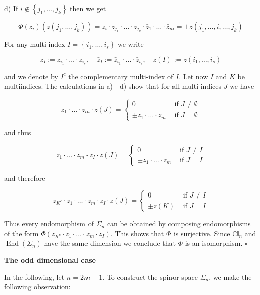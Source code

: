 \documentclass[10pt, letterpaper]{article}
\begin{document}
d) If $i \notin\left\{j_{1}, \ldots, j_{k}\right\}$ then we get

$$
\Phi\left(z_{i}\right)\left(z\left(j_{1}, \ldots, j_{k}\right)\right)=z_{i} \cdot z_{j_{1}} \cdot \ldots \cdot z_{j_{k}} \cdot \bar{z}_{1} \cdot \ldots \cdot \bar{z}_{m}= \pm z\left(j_{1}, \ldots, i, \ldots, j_{k}\right)
$$

For any multi-index $I=\left\{i_{1}, \ldots, i_{s}\right\}$ we write

$$
z_{I}:=z_{i_{1}} \cdot \ldots \cdot z_{i_{s}}, \quad \bar{z}_{I}:=\bar{z}_{i_{1}} \cdot \ldots \cdot \bar{z}_{i_{s}}, \quad z(I):=z\left(i_{1}, \ldots, i_{s}\right)
$$

and we denote by $I^{c}$ the complementary multi-index of $I$. Let now $I$ and $K$ be multiindices. The calculations in a) - d) show that for all multi-indices $J$ we have

$$
z_{1} \cdot \ldots \cdot z_{m} \cdot z(J)= \begin{cases}0 & \text { if } J \neq \emptyset \\ \pm z_{1} \cdot \ldots \cdot z_{m} & \text { if } J=\emptyset\end{cases}
$$

and thus

$$
z_{1} \cdot \ldots \cdot z_{m} \cdot \bar{z}_{I} \cdot z(J)= \begin{cases}0 & \text { if } J \neq I \\ \pm z_{1} \cdot \ldots \cdot z_{m} & \text { if } J=I\end{cases}
$$

and therefore

$$
\bar{z}_{K^{c}} \cdot z_{1} \cdot \ldots \cdot z_{m} \cdot \bar{z}_{I} \cdot z(J)= \begin{cases}0 & \text { if } J \neq I \\ \pm z(K) & \text { if } J=I\end{cases}
$$

Thus every endomorphism of $\Sigma_{n}$ can be obtained by composing endomorphisms of the form $\Phi\left(\bar{z}_{K^{c}} \cdot z_{1} \cdot \ldots \cdot z_{m} \cdot \bar{z}_{I}\right)$. This shows that $\Phi$ is surjective. Since $\mathbb{C l}_{n}$ and $\operatorname{End}\left(\Sigma_{n}\right)$ have the same dimension we conclude that $\Phi$ is an isomorphism. \(\square\)


\pagebreak


\textbf{The odd dimensional case}

In the following, let $n=2 m-1$. To construct the spinor space $\Sigma_{n}$, we make the following observation:
\end{document}
